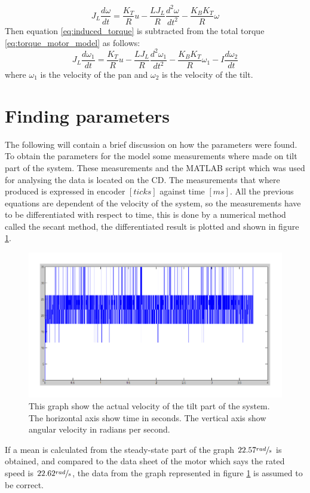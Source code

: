 \begin{equation}
	J_L \frac{d\omega}{dt} = \frac{K_T}{R} u - \frac{L J_L}{R} \frac{d^{2}\omega}{dt^{2}} - \frac{K_B K_T}{R} \omega\label{eq:torque_motor_model}
\end{equation}
Then equation \ref{eq:induced_torque} is subtracted from the total torque \ref{eq:torque_motor_model} as follows:
\begin{equation}
	J_L \frac{d\omega_{1}}{dt} = \frac{K_T}{R} u - \frac{L J_L}{R} \frac{d^{2}\omega_{1}}{dt^{2}} - \frac{K_B K_T}{R} \omega_{1} - I \frac{d\omega_{2}}{dt}\label{eq:coupled_torque_motor_model}
\end{equation}
where $\omega_1$ is the velocity of the pan and $\omega_2$ is the velocity of the tilt. 

\section{Finding parameters}
The following will contain a brief discussion on how the parameters were found. To obtain the parameters for the model some measurements where made on tilt part of the system. These measurements and the MATLAB script which was used for analysing the data is located on the CD. The measurements that where produced is expressed in encoder $[ticks]$ against time $[ms]$. All the previous equations are dependent of the velocity of the system, so the measurements have to be differentiated with respect to time, this is done by a numerical method called the secant method, the differentiated result is plotted and shown in figure \ref{fig:measured_step_tilt}.
\begin{figure}[htb]
	\centering
	\includegraphics[width=\textwidth]{graphics/measured_step_tilt.pdf} %
	\caption{This graph show the actual velocity of the tilt part of the system. The horizontal axis show time in seconds. The vertical axis show angular velocity in radians per second.}
	\label{fig:measured_step_tilt}			%
\end{figure}
If a mean is calculated from the steady-state part of the graph $22.57 \sfrac{rad}{s}$ is obtained, and compared to the data sheet of the motor which says the rated speed is $22.62 \sfrac{rad}{s}$, the data from the graph represented in figure \ref{fig:measured_step_tilt} is assumed to be correct.

